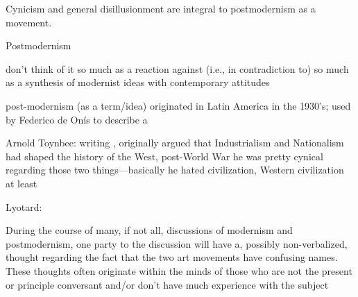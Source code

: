 \documentclass[../butidigress.tex]{subfiles}
\newcounter{worldwarcounter}\setcounter{worldwarcounter}{1}
\begin{document}
\setcounter{worldwarcounter}{2}

Cynicism and general disillusionment are integral to postmodernism as a movement.

\begin{somenotes}{Postmodernism}
    \item don't think of it so much as a reaction against (i.e., in contradiction to) so much as a synthesis of modernist ideas with contemporary attitudes
    \item post-modernism (as a term/idea) originated in Latin America in the 1930's; used by Federico de Onís to describe a \autocite[4]{originspostmodernity}
    \item Arnold Toynbee: writing , originally argued that Industrialism and Nationalism had shaped the history of the West, post-World War  he was pretty cynical regarding those two things---basically he hated civilization, Western civilization at least
    \item Lyotard: \autocite{postmodernsep}
\end{somenotes}

During the course of many, if not all, discussions of modernism and postmodernism, one party to the discussion will have a, possibly non-verbalized, thought regarding the fact that the two art movements have confusing names.
These thoughts often originate within the minds of those who are not the present or principle conversant and/or don't have much experience with the subject


\end{document}
